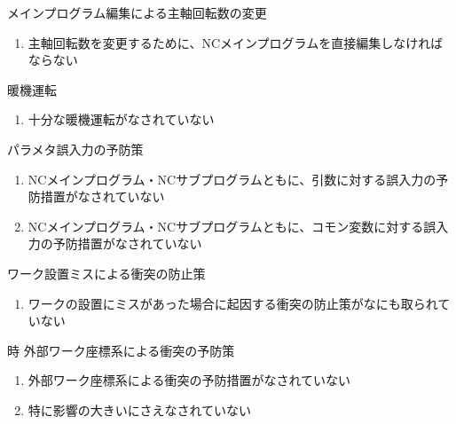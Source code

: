 \begin{Issues}{メインプログラム編集による主軸回転数の変更}
\begin{enumerate}[label=\sarrow]
\item[{\sarrow[red]}]主軸回転数を変更するために、NCメインプログラムを直接編集しなければならない
\end{enumerate}
\end{Issues}


\clearpage

\begin{Issues}{暖機運転}
\begin{enumerate}[label=\sarrow]
\item[{\sarrow[red]}]十分な暖機運転がなされていない
\end{enumerate}
\end{Issues}

\begin{Issues}{パラメタ誤入力の予防策}
\begin{enumerate}[label=\sarrow]
\item[{\sarrow[red]}]NCメインプログラム・NCサブプログラムともに、引数に対する誤入力の予防措置がなされていない
\item[{\sarrow[red]}]NCメインプログラム・NCサブプログラムともに、コモン変数に対する誤入力の予防措置がなされていない
\end{enumerate}
\end{Issues}

\begin{Issues}{ワーク設置ミスによる衝突の防止策}
\begin{enumerate}[label=\sarrow]
\item[{\sarrow[red]}]ワークの設置にミスがあった場合に起因する衝突の防止策がなにも取られていない
\end{enumerate}
\end{Issues}

\begin{Issues}{\KeywayMilling 時 外部ワーク座標系による衝突の予防策}
\begin{enumerate}[label=\sarrow]
\item[{\sarrow[red]}]外部ワーク座標系による衝突の予防措置がなされていない
\item[{\sarrow[red]}]特に影響の大きい\KeywayMilling にさえなされていない
\end{enumerate}
\end{Issues}



